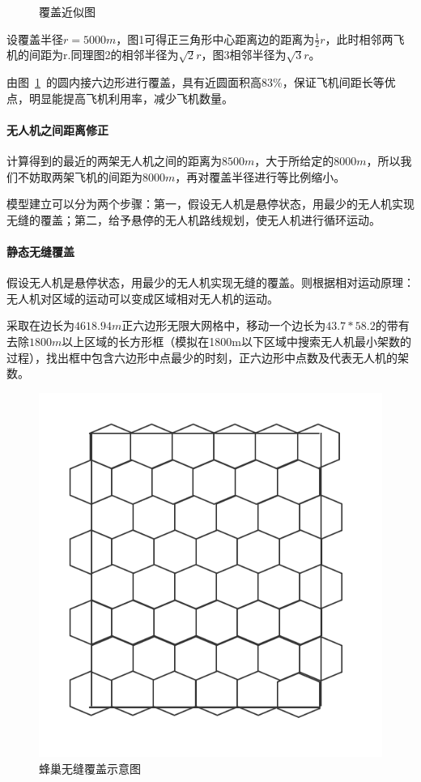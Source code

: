 \documentclass{whutmod}
\begin{document}
	\begin{figure}[H]
		\centering
		\quad
		\quad
		\caption{覆盖近似图}\label{llll}
	\end{figure}
	
	设覆盖半径$r=5000m$，图1可得正三角形中心距离边的距离为$\frac{1}{2}r$，此时相邻两飞机的间距为r.同理图2的相邻半径为$\sqrt{2}r$，图3相邻半径为$\sqrt{3}r$。
	
	
	由图~\ref{llll}~的圆内接六边形进行覆盖，具有近圆面积高83\%，保证飞机间距长等优点，明显能提高飞机利用率，减少飞机数量。
	\paragraph{无人机之间距离修正}
	计算得到的最近的两架无人机之间的距离为$8500m$，大于所给定的$8000m$，所以我们不妨取两架飞机的间距为$8000m$，再对覆盖半径进行等比例缩小。
	
	 模型建立可以分为两个步骤：第一，假设无人机是悬停状态，用最少的无人机实现无缝的覆盖；第二，给予悬停的无人机路线规划，使无人机进行循环运动。
		
	\paragraph{静态无缝覆盖}
	 假设无人机是悬停状态，用最少的无人机实现无缝的覆盖。则根据相对运动原理：无人机对区域的运动可以变成区域相对无人机的运动。
	 
	采取在边长为$4618.94m$正六边形无限大网格中，移动一个边长为$43.7*58.2$的带有去除$1800m$以上区域的长方形框（模拟在1800m以下区域中搜索无人机最小架数的过程），找出框中包含六边形中点最少的时刻，正六边形中点数及代表无人机的架数。
		
			\begin{figure}[H]
		\centering
		\includegraphics[width=.5\textwidth]{figures/jj.png}
		\caption{蜂巢无缝覆盖示意图}
	\end{figure}
\end{document}
